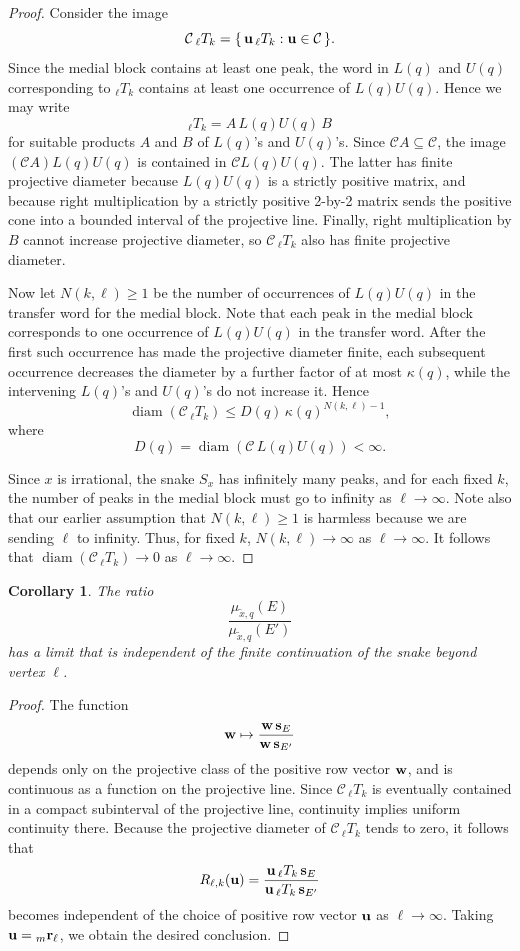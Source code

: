 \documentclass[12pt]{article}
\theoremstyle{plain}
\newtheorem{corollary}[theorem]{Corollary}
\theoremstyle{definition}
\theoremstyle{remark}
\begin{document}
\begin{proof}
Consider the image \[ \mathcal C\,{}_{\ell}T_k = 
\{\,{\bf u}\,{}_{\ell}T_k:{\bf u}\in\mathcal C\,\}.  \]
Since the medial block contains at least one peak,
the word in $L(q)$ and $U(q)$ corresponding to ${}_{\ell}T_k$
contains at least one occurrence of $L(q)U(q)$.
Hence we may write \[ {}_{\ell}T_k=A\,L(q)U(q)\,B \]
for suitable products $A$ and $B$ of $L(q)$'s and $U(q)$'s.
Since $\mathcal C A\subseteq\mathcal C$,
the image $(\mathcal C A)L(q)U(q)$ is contained in
$\mathcal C L(q)U(q)$.
The latter has finite projective diameter because
$L(q)U(q)$ is a strictly positive matrix,
and because right multiplication by a strictly positive 2-by-2 matrix 
sends the positive cone into a bounded interval of the projective line.
Finally, right multiplication by $B$ cannot increase projective diameter,
so $\mathcal C\,{}_{\ell}T_k$ also has finite projective diameter.

Now let $N(k,\ell) \geq 1$ be the number of occurrences 
of $L(q)U(q)$ in the transfer word for the medial block.
Note that each peak in the medial block corresponds
to one occurrence of $L(q)U(q)$ in the transfer word.
After the first such occurrence has made the projective diameter finite,
each subsequent occurrence decreases the diameter by a further factor
of at most $\kappa(q)$, while the intervening $L(q)$'s and $U(q)$'s do not
increase it. Hence
\[ \operatorname{diam}(\mathcal C\,{}_{\ell}T_k) \le
D(q)\,\kappa(q)^{N(k,\ell)-1}, \]
where
\[ D(q)=\operatorname{diam}(\mathcal C\,L(q)U(q))<\infty .  \]

Since $x$ is irrational, the snake $S_x$ has infinitely many peaks,
and for each fixed $k$, the number of peaks in the medial block
must go to infinity as $\ell \rightarrow \infty$.
Note also that our earlier assumption that $N(k,\ell) \geq 1$
is harmless because we are sending $\ell$ to infinity.
Thus, for fixed $k$, $N(k,\ell)\rightarrow\infty$
as $\ell\rightarrow\infty$. It follows that
$\operatorname{diam}(\mathcal C\,{}_{\ell}T_k) \rightarrow 0$
as $\ell\rightarrow\infty$.
\end{proof}

\begin{corollary}
The ratio
\[ \frac{\mu_{\tilde{x},q}(E)} {\mu_{\tilde{x},q}(E')} \]
has a limit that is independent of the finite continuation of the snake
beyond vertex $\ell$.
\end{corollary}

\begin{proof}
The function
\[ {\bf w} \mapsto \frac{{\bf w}\,{\bf s}_E} {{\bf w}\,{\bf s}_{E'}} \]
depends only on the projective class of the positive row vector
${\bf w}$, and is continuous as a function on the projective line.
Since $\mathcal C\,{}_{\ell}T_k$ is eventually contained in 
a compact subinterval of the projective line,
continuity implies uniform continuity there.
Because the projective diameter of $\mathcal C\,{}_{\ell}T_k$
tends to zero, it follows that
\[ R_{\ell,k}({\bf u}) =
\frac{{\bf u}\,{}_{\ell}T_k\,{\bf s}_E}
     {{\bf u}\,{}_{\ell}T_k\,{\bf s}_{E'}} \]
becomes independent of the choice of positive row vector ${\bf u}$ as
$\ell\to\infty$.
Taking ${\bf u}={}_m{\bf r}_{\ell}$, we obtain the desired conclusion.
\end{proof}
\end{document}
